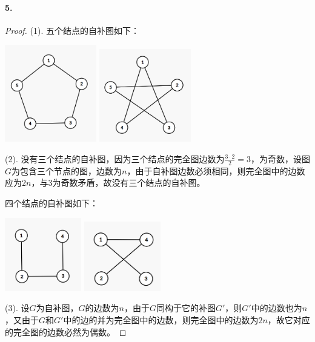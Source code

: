 \documentclass[12pt, a4paper, oneside]{ctexart}
\begin{document}
\paragraph{5.}\begin{proof}

    (1). 五个结点的自补图如下：

    \centerline{
        \includegraphics[width=0.3\textwidth]{graph1.png}
        \includegraphics[width=0.3\textwidth]{graph2.png}
    }

    (2). 没有三个结点的自补图，因为三个结点的完全图边数为$\frac{3\cdot 2}{2} = 3$，为奇数，设图$G$为包含三个节点的图，边数为$n$，由于自补图边数必须相同，则完全图中的边数应为$2n$，与$3$为奇数矛盾，故没有三个结点的自补图。

    四个结点的自补图如下：

    \centerline{
        \includegraphics[width=0.25\textwidth]{graph3.png}
        \includegraphics[width=0.25\textwidth]{graph4.png}
    }

    (3). 设$G$为自补图，$G$的边数为$n$，由于$G$同构于它的补图$G'$，则$G'$中的边数也为$n$，又由于$G$和$G'$中的边的并为完全图中的边数，则完全图中的边数为$2n$，故它对应的完全图的边数必然为偶数。
\end{proof}
\end{document}
